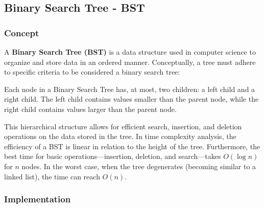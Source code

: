 \subsection{Binary Search Tree - BST}

\subsubsection{Concept}

A \textbf{Binary Search Tree (BST)} is a data structure used in computer science to organize and store data in an ordered manner. Conceptually, a tree must adhere to specific criteria to be considered a binary search tree:

Each node in a Binary Search Tree has, at most, two children: a left child and a right child. The left child contains values smaller than the parent node, while the right child contains values larger than the parent node.

This hierarchical structure allows for efficient search, insertion, and deletion operations on the data stored in the tree. In time complexity analysis, the efficiency of a BST is linear in relation to the height of the tree. Furthermore, the best time for basic operations—insertion, deletion, and search—takes $O(\log n)$ for $n$ nodes. In the worst case, when the tree degenerates (becoming similar to a linked list), the time can reach $O(n)$.

\subsubsection{Implementation}


